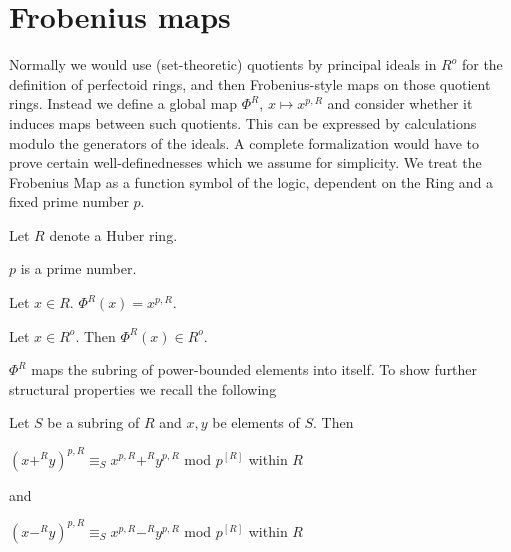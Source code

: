 \documentclass[english,11pt]{article}
\begin{document}
\section{Frobenius maps}
Normally we would use (set-theoretic) quotients by principal ideals in $R^o$
for the definition of perfectoid rings, and then Frobenius-style maps on
those quotient rings.
Instead we define a global map $\Phi^R$, $x \mapsto x^{p,R}$ and consider
whether it induces maps between such quotients. This
can be expressed by calculations modulo the generators of the ideals. 
A complete formalization would have to prove certain well-definednesses
which we assume for simplicity.
We treat the Frobenius Map as a function symbol of the logic, dependent
on the Ring and a fixed prime number $p$.

\begin{forthel}

Let $R$ denote a Huber ring.

\begin{signature} $p$ is a prime number. 
\end{signature}

\begin{definition}
Let $x \in R$. $\Phi^{R} (x) = x^{p,R}$. 
\end{definition}

\begin{lemma}
Let $x \in R^o$. Then $\Phi^{R}(x) \in R^o$.
\end{lemma}

\end{forthel}

$\Phi^{R}$ maps the subring of power-bounded elements into itself.
To show further structural properties we recall the following

\begin{lemma*}
Let $S$ be a subring of $R$ and $x,y$ be elements of $S$.
Then 

$(x +^{R} y)^{p,R} \equiv_{S} 
x^{p,R} +^{R} y^{p,R}$ mod $p^{[R]}$ within $R$ 

and

$(x -^{R} y)^{p,R} \equiv_{S} 
x^{p,R} -^{R} y^{p,R}$ mod $p^{[R]}$ within $R$ 
\end{lemma*}
\end{document}
